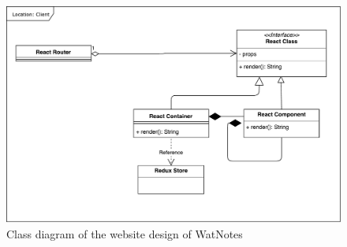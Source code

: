 \documentclass[12pt]{article}
\begin{document}
  \begin{figure}[H]
    \centering
    \includegraphics[width=\textwidth]{assets/frontend_design.pdf}
    \caption{Class diagram of the website design of WatNotes}
  \end{figure}
\end{document}
